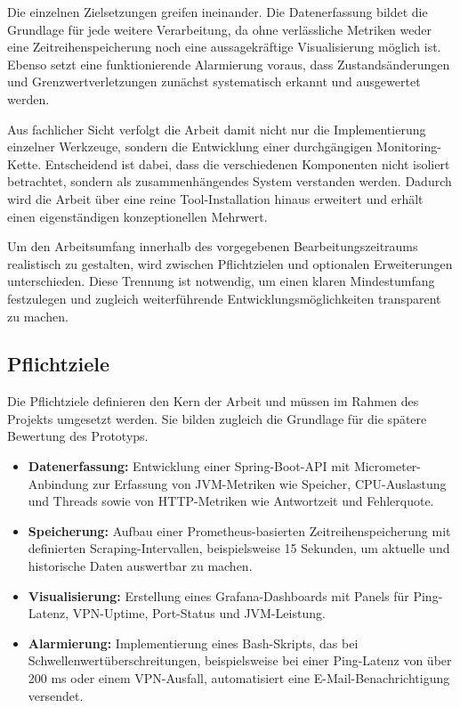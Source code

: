 Die einzelnen Zielsetzungen greifen ineinander. Die Datenerfassung bildet die Grundlage für jede weitere Verarbeitung, da ohne verlässliche Metriken weder eine Zeitreihenspeicherung noch eine aussagekräftige Visualisierung möglich ist. Ebenso setzt eine funktionierende Alarmierung voraus, dass Zustandsänderungen und Grenzwertverletzungen zunächst systematisch erkannt und ausgewertet werden.  

Aus fachlicher Sicht verfolgt die Arbeit damit nicht nur die Implementierung einzelner Werkzeuge, sondern die Entwicklung einer durchgängigen Monitoring-Kette. Entscheidend ist dabei, dass die verschiedenen Komponenten nicht isoliert betrachtet, sondern als zusammenhängendes System verstanden werden. Dadurch wird die Arbeit über eine reine Tool-Installation hinaus erweitert und erhält einen eigenständigen konzeptionellen Mehrwert.  

Um den Arbeitsumfang innerhalb des vorgegebenen Bearbeitungszeitraums realistisch zu gestalten, wird zwischen Pflichtzielen und optionalen Erweiterungen unterschieden. Diese Trennung ist notwendig, um einen klaren Mindestumfang festzulegen und zugleich weiterführende Entwicklungsmöglichkeiten transparent zu machen.  

\subsection{Pflichtziele}

Die Pflichtziele definieren den Kern der Arbeit und müssen im Rahmen des Projekts umgesetzt werden. Sie bilden zugleich die Grundlage für die spätere Bewertung des Prototyps.  

\begin{itemize}
    \item \textbf{Datenerfassung:} Entwicklung einer Spring-Boot-API mit Micrometer-Anbindung zur Erfassung von JVM-Metriken wie Speicher, CPU-Auslastung und Threads sowie von HTTP-Metriken wie Antwortzeit und Fehlerquote.  
    
    \item \textbf{Speicherung:} Aufbau einer Prometheus-basierten Zeitreihenspeicherung mit definierten Scraping-Intervallen, beispielsweise 15 Sekunden, um aktuelle und historische Daten auswertbar zu machen.  
    
    \item \textbf{Visualisierung:} Erstellung eines Grafana-Dashboards mit Panels für Ping-Latenz, VPN-Uptime, Port-Status und JVM-Leistung.  
    
    \item \textbf{Alarmierung:} Implementierung eines Bash-Skripts, das bei Schwellenwertüberschreitungen, beispielsweise bei einer Ping-Latenz von über 200 ms oder einem VPN-Ausfall, automatisiert eine E-Mail-Benachrichtigung versendet.  
\end{itemize}

